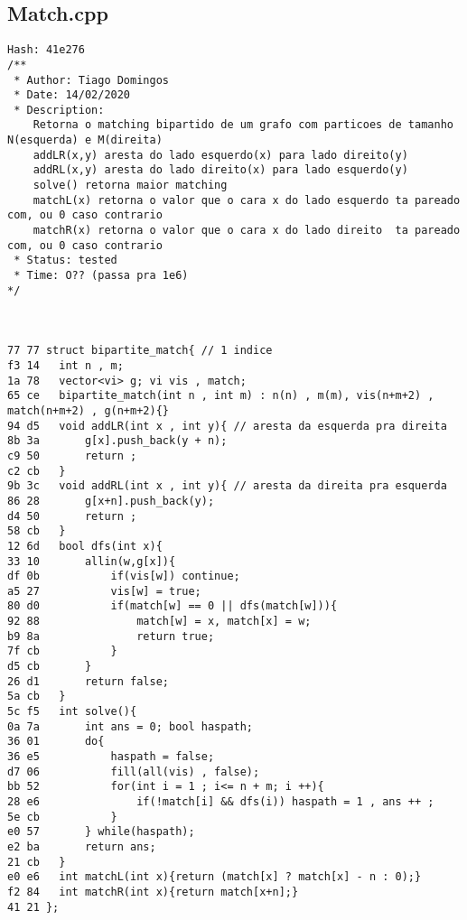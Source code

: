 \documentclass[11pt, a4paper, twoside]{article}
\begin{document}
\subsection{Match.cpp}
\begin{lstlisting}
Hash: 41e276
/**
 * Author: Tiago Domingos
 * Date: 14/02/2020
 * Description:
	Retorna o matching bipartido de um grafo com particoes de tamanho N(esquerda) e M(direita)
	addLR(x,y) aresta do lado esquerdo(x) para lado direito(y)
	addRL(x,y) aresta do lado direito(x) para lado esquerdo(y)
	solve() retorna maior matching
	matchL(x) retorna o valor que o cara x do lado esquerdo ta pareado com, ou 0 caso contrario
	matchR(x) retorna o valor que o cara x do lado direito  ta pareado com, ou 0 caso contrario
 * Status: tested 
 * Time: O?? (passa pra 1e6)
*/



77 77 struct bipartite_match{ // 1 indice
f3 14 	int n , m;
1a 78 	vector<vi> g; vi vis , match;
65 ce 	bipartite_match(int n , int m) : n(n) , m(m), vis(n+m+2) , match(n+m+2) , g(n+m+2){}
94 d5 	void addLR(int x , int y){ // aresta da esquerda pra direita
8b 3a 		g[x].push_back(y + n);
c9 50 		return ;
c2 cb 	}
9b 3c 	void addRL(int x , int y){ // aresta da direita pra esquerda
86 28 		g[x+n].push_back(y);
d4 50 		return ;
58 cb 	}
12 6d 	bool dfs(int x){
33 10 		allin(w,g[x]){
df 0b 			if(vis[w]) continue;
a5 27 			vis[w] = true;
80 d0 			if(match[w] == 0 || dfs(match[w])){
92 88 				match[w] = x, match[x] = w; 
b9 8a 				return true;
7f cb 			}
d5 cb 		}
26 d1 		return false;
5a cb 	}
5c f5 	int solve(){
0a 7a 		int ans = 0; bool haspath;
36 01 		do{
36 e5 			haspath = false;
d7 06 			fill(all(vis) , false);
bb 52 			for(int i = 1 ; i<= n + m; i ++){
28 e6 				if(!match[i] && dfs(i)) haspath = 1 , ans ++ ;
5e cb 			}
e0 57 		} while(haspath);
e2 ba 		return ans;
21 cb 	}
e0 e6 	int matchL(int x){return (match[x] ? match[x] - n : 0);}
f2 84 	int matchR(int x){return match[x+n];}
41 21 };
\end{lstlisting}
\end{document}
